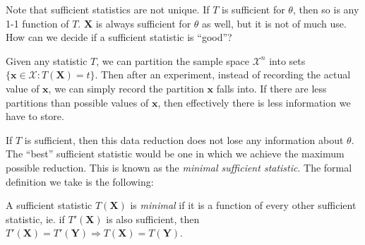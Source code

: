 \documentclass[a4paper]{article}
\begin{document}
Note that sufficient statistics are not unique. If $T$ is sufficient for $\theta$, then so is any 1-1 function of $T$. $\mathbf{X}$ is always sufficient for $\theta$ as well, but it is not of much use. How can we decide if a sufficient statistic is ``good''?

Given any statistic $T$, we can partition the sample space $\mathcal{X}^n$ into sets $\{\mathbf{x}\in \mathcal{X}: T(\mathbf{X}) = t\}$. Then after an experiment, instead of recording the actual value of $\mathbf{x}$, we can simply record the partition $\mathbf{x}$ falls into. If there are less partitions than possible values of $\mathbf{x}$, then effectively there is less information we have to store.

If $T$ is sufficient, then this data reduction does not lose any information about $\theta$. The ``best'' sufficient statistic would be one in which we achieve the maximum possible reduction. This is known as the \emph{minimal sufficient statistic}. The formal definition we take is the following:

\begin{defi}
  A sufficient statistic $T(\mathbf{X})$ is \emph{minimal} if it is a function of every other sufficient statistic, ie. if $T'(\mathbf{X})$ is also sufficient, then $T'(\mathbf{X}) = T'(\mathbf{Y}) \Rightarrow T(\mathbf{X}) = T(\mathbf{Y})$.
\end{defi}
\end{document}
